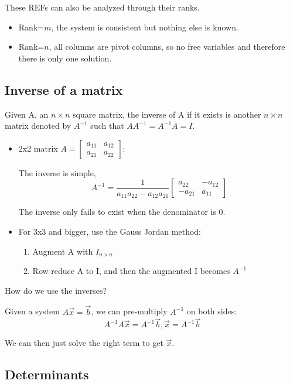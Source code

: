 \documentclass{article}
\begin{document}
These REFs can also be analyzed through their ranks. 
\begin{itemize}
	\item Rank=$m$, the system is consistent but nothing else is known.
	\item Rank=$n$, all columns are pivot columns, so no free variables
		and therefore there is only one solution.
\end{itemize}

\subsection{Inverse of a matrix}

Given A, an $n\times n$ square matrix, the inverse of A if it exists is
another $n\times n$ matrix denoted by $A^{-1}$ such that $AA^{-1}=A^{-1}A=I$.

\begin{itemize}
	\item 2x2 matrix 
		$A=\begin{bmatrix}a_{11}&a_{12}\\a_{21}&a_{22}\end{bmatrix}$: 
		
		The inverse is simple, 
		$$A^{-1}=\frac{1}{a_{11}a_{22}-a_{12}a_{21}}
		\begin{bmatrix}a_{22}&-a_{12}\\-a_{21}&a_{11}\end{bmatrix}$$

		The inverse only fails to exist when the denominator is 0.
	\item For 3x3 and bigger, use the Gauss Jordan method:
		\begin{enumerate}
			\item Augment A with $I_{n\times n}$
			\item Row reduce A to I, and then the augmented
				I becomes $A^{-1}$
		\end{enumerate}
\end{itemize}

How do we use the inverses?

Given a system $A\vec{x}=\vec{b}$, we can pre-multiply $A^{-1}$ on both sides:
$$A^{-1}A\vec{x}=A^{-1}\vec{b}, \vec{x}=A^{-1}\vec{b}$$

We can then just solve the right term to get $\vec{x}$.

\subsection{Determinants}
\end{document}
